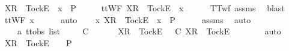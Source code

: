 \ {\isachardoublequoteopen}{\isacharbrackleft}X{\isacharbrackright}\isactrlsub R\ {\isacharhash}\ {\isacharbrackleft}Tock{\isacharbrackright}\isactrlsub E\ {\isacharhash}\ x\ {\isasymin}\ P{\isachardoublequoteclose}\isanewline
\ \ \isamarkupfalse%
\ \isamarkupfalse%
\ {\isachardoublequoteopen}ttWF\ {\isacharparenleft}{\isacharbrackleft}X{\isacharbrackright}\isactrlsub R\ {\isacharhash}\ {\isacharbrackleft}Tock{\isacharbrackright}\isactrlsub E\ {\isacharhash}\ x{\isacharparenright}{\isachardoublequoteclose}\isanewline
\ \ \ \ \isamarkupfalse%
\ TT{\isacharunderscore}wf\ assms{\isacharparenleft}{}{\isacharparenright}\ \isamarkupfalse%
\ blast\isanewline
\ \ \isamarkupfalse%
\ \isamarkupfalse%
\ {\isachardoublequoteopen}ttWF\ x{\isachardoublequoteclose}\isanewline
\ \ \ \ \isamarkupfalse%
\ auto\isanewline
{}\isamarkupfalse%
\isanewline
\ \ \isamarkupfalse%
\ {\isachardoublequoteopen}{\isasymexists}x{\isachardot}\ {\isacharbrackleft}X{\isacharbrackright}\isactrlsub R\ {\isacharhash}\ {\isacharbrackleft}Tock{\isacharbrackright}\isactrlsub E\ {\isacharhash}\ x\ {\isasymin}\ P{\isachardoublequoteclose}\isanewline
\ \ \ \ \isamarkupfalse%
\ assms{\isacharparenleft}{}{\isacharparenright}\ \isamarkupfalse%
\ auto\isanewline
{}\isamarkupfalse%
\isanewline
\ \ \isamarkupfalse%
\ {\isasymrho}\ {\isasymsigma}\ {\isacharcolon}{\isacharcolon}\ {\isachardoublequoteopen}{\isacharprime}a\ ttobs\ list{\isachardoublequoteclose}\isanewline
\ \ \isamarkupfalse%
\ {\isachardoublequoteopen}{\isasymrho}\ {\isasymlesssim}\isactrlsub C\ {\isasymsigma}{\isachardoublequoteclose}\isanewline
\ \ \isamarkupfalse%
\ \isamarkupfalse%
\ {\isachardoublequoteopen}{\isacharbrackleft}X{\isacharbrackright}\isactrlsub R\ {\isacharhash}\ {\isacharbrackleft}Tock{\isacharbrackright}\isactrlsub E\ {\isacharhash}\ {\isasymrho}\ {\isasymlesssim}\isactrlsub C\ {\isacharbrackleft}X{\isacharbrackright}\isactrlsub R\ {\isacharhash}\ {\isacharbrackleft}Tock{\isacharbrackright}\isactrlsub E\ {\isacharhash}\ {\isasymsigma}{\isachardoublequoteclose}\isanewline
\ \ \ \ \isamarkupfalse%
\ auto\isanewline
\ \ \isamarkupfalse%
\ \isamarkupfalse%
\ {\isachardoublequoteopen}{\isacharbrackleft}X{\isacharbrackright}\isactrlsub R\ {\isacharhash}\ {\isacharbrackleft}Tock{\isacharbrackright}\isactrlsub E\ {\isacharhash}\ {\isasymsigma}\ {\isasymin}\ P{\isachardoublequoteclose}\isanewline
